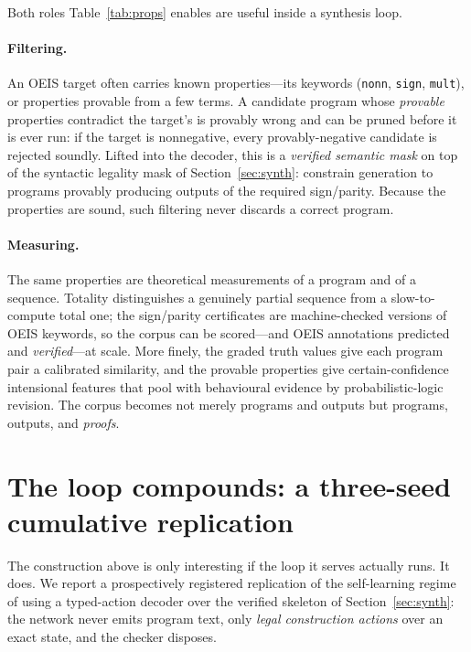 \documentclass[11pt]{article}
\newcommand{\code}[1]{\texttt{#1}}
\begin{document}
Both roles Table~\ref{tab:props} enables are useful inside a synthesis loop.

\paragraph{Filtering.} An OEIS target often carries known properties---its keywords
(\code{nonn}, \code{sign}, \code{mult}), or properties provable from a few terms. A
candidate program whose \emph{provable} properties contradict the target's is provably
wrong and can be pruned before it is ever run: if the target is nonnegative, every
provably-negative candidate is rejected soundly. Lifted into the decoder, this is a
\emph{verified semantic mask} on top of the syntactic legality mask of
Section~\ref{sec:synth}: constrain generation to programs provably producing outputs of the
required sign/parity. Because the properties are sound, such filtering never discards a
correct program.

\paragraph{Measuring.} The same properties are theoretical measurements of a program and of
a sequence. Totality distinguishes a genuinely partial sequence from a slow-to-compute total
one; the sign/parity certificates are machine-checked versions of OEIS keywords, so the
corpus can be scored---and OEIS annotations predicted and \emph{verified}---at scale. More
finely, the graded truth values give each program pair a calibrated similarity, and the
provable properties give certain-confidence intensional features that pool with behavioural
evidence by probabilistic-logic revision. The corpus becomes not merely programs and
outputs but programs, outputs, and \emph{proofs}.

\section{The loop compounds: a three-seed cumulative replication}
\label{sec:loop}

The construction above is only interesting if the loop it serves actually runs. It does. We
report a prospectively registered replication of the self-learning regime of
\cite{gauthier2023} using a typed-action decoder over the verified skeleton of
Section~\ref{sec:synth}: the network never emits program text, only \emph{legal construction
actions} over an exact state, and the checker disposes.
\end{document}
